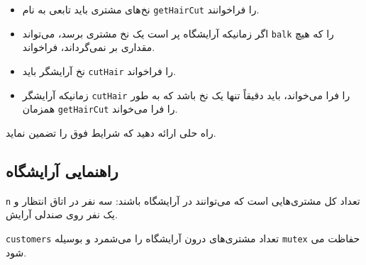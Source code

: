 \documentclass{book}
\newcommand{\clearemptydoublepage}{\newpage\cleardoublepage}
\begin{document}
\begin{itemize}

\item %
    نخ‌های مشتری باید تابعی به نام {\tt getHairCut} را فراخوانند. 

\item 
    اگر زمانیکه آرایشگاه پر است یک نخ مشتری برسد، می‌تواند {\tt balk} را که هیچ مقداری بر نمی‌گرداند،  فراخواند. 

\item %
    نخ آرایشگر باید {\tt cutHair} را فراخواند. 

\item 
    زمانیکه آرایشگر {\tt cutHair} را فرا می‌خواند،‌ باید دقیقاً تنها یک نخ باشد که به طور همزمان  {\tt getHairCut} را فرا می‌خواند. 

\end{itemize}

    راه حلی ارائه دهید  که شرایط فوق را تضمین نماید. 


\clearemptydoublepage
\subsection{راهنمایی آرایشگاه}

\begin{latin}
%

\end{latin}

    {\tt n}    تعداد کل مشتری‌هایی است که می‌توانند در آرایشگاه باشند: سه نفر در اتاق انتظار و یک نفر روی صندلی آرایش. 

    {\tt customers}        تعداد مشتری‌های درون آرایشگاه را می‌شمرد و بوسیله  {\tt mutex} حفاظت می‌ شود. 
    
\end{document}
